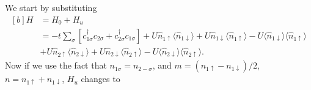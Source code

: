 \begin{questions}
\begin{solution}
 We start by substituting
 \begin{equation}
   \begin{aligned}[b]
   H &= H_0 + H_u \\ &= -t\sum_\sigma [c_{1\sigma}^\dagger c_{2\sigma} + c_{2\sigma}^\dagger c_{1\sigma}] + U \hat{n}_{1\uparrow}\langle\hat{n}_{1\downarrow}\rangle + U \hat{n}_{1\downarrow}\langle\hat{n}_{1\uparrow}\rangle - U \langle\hat{n}_{1\downarrow}\rangle \langle\hat{n}_{1\uparrow}\rangle\\
   &+U \hat{n}_{2\uparrow}\langle\hat{n}_{2\downarrow}\rangle+ U \hat{n}_{2\downarrow}\langle\hat{n}_{2\uparrow}\rangle - U \langle\hat{n}_{2\downarrow}\rangle \langle\hat{n}_{2\uparrow}\rangle.
 \end{aligned}
 \end{equation}
Now if we use the fact that $n_{1\sigma} = n_{2-\sigma}$, and $m=(n_{1\uparrow} - n_{1\downarrow})/2$, $n =n_{1\uparrow} + n_{1\downarrow} $, $H_u$ changes to


\end{solution}
\end{questions}
